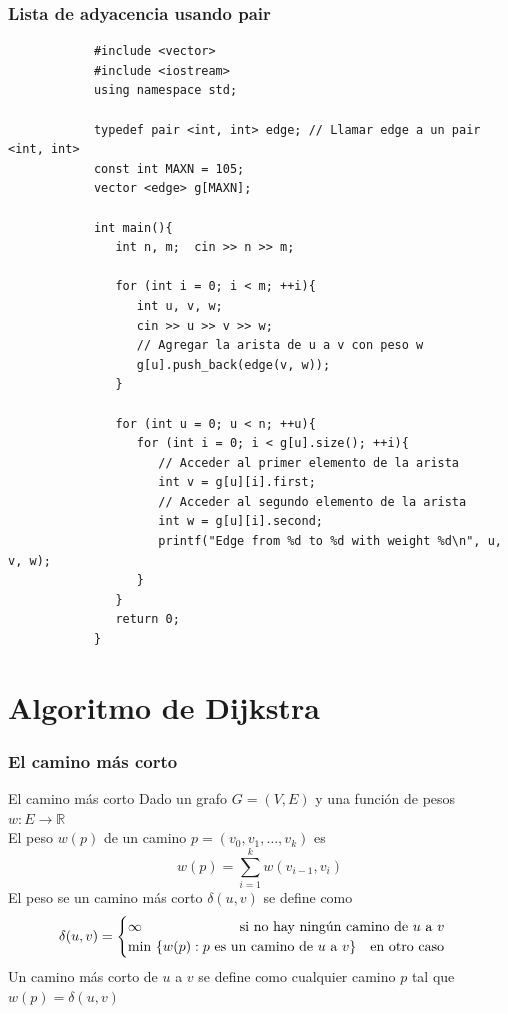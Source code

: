 \documentclass{beamer}
\begin{document}
	
	\begin{frame}
		\frametitle{Lista de adyacencia usando pair}
		\begin{lstlisting}
			#include <vector>
			#include <iostream>
			using namespace std;

			typedef pair <int, int> edge; // Llamar edge a un pair <int, int>
			const int MAXN = 105;
			vector <edge> g[MAXN];

			int main(){
			   int n, m;  cin >> n >> m;
			
			   for (int i = 0; i < m; ++i){
			      int u, v, w;
			      cin >> u >> v >> w;
			      // Agregar la arista de u a v con peso w
			      g[u].push_back(edge(v, w));
			   }
			
			   for (int u = 0; u < n; ++u){
			      for (int i = 0; i < g[u].size(); ++i){
			         // Acceder al primer elemento de la arista
			         int v = g[u][i].first;
			         // Acceder al segundo elemento de la arista
			         int w = g[u][i].second;
			         printf("Edge from %d to %d with weight %d\n", u, v, w);
			      }
			   }
			   return 0;
			} 
		\end{lstlisting}
	\end{frame}

\section{Algoritmo de Dijkstra}
	\begin{frame}
		\frametitle{El camino más corto}
		\begin{block}{El camino más corto}
			Dado un grafo $G = (V, E)$ y una función de pesos $w : E \rightarrow \mathbb{R}$\\
			El peso $w(p)$ de un camino $p = (v_0, v_1, \ldots, v_k)$ es
				$$w(p) = \displaystyle\sum_{i = 1}^{k}{w(v_{i-1}, v_{i})}$$
			El peso se un camino más corto $\delta(u, v)$ se define como
				$$\delta (u, v)  =
					\begin{cases}
						\infty \text{\quad\qquad\qquad\qquad si no hay ningún camino de } u \text{ a } v \\
						\text{min }\{ w(p) : p \text{ es un camino de } u \text{ a } v \} \text{\quad en otro caso}
					\end{cases}
				$$
			Un camino más corto de $u$ a $v$ se define como cualquier camino $p$ tal que $w(p) = \delta(u, v)$
		\end{block}
	\end{frame}
	
\end{document}

